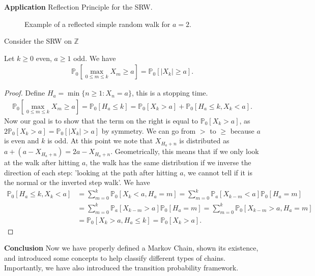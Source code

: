 \noindent
\textbf{Application} Reflection Principle for the SRW.
\begin{figure}[h!]
\begin{center}
\end{center}
\caption{Example of a reflected simple random walk for $a=2$.}
\end{figure}

Consider the SRW on $\mathbb{Z}$ 

\begin{prop}[]
Let $k\geq 0$ even, $a\geq1$ odd. We have 
\begin{align}
	\mathbb{P}_{0} \left[ \max_{0 \leq m \leq k} X_m \geq a \right] = \mathbb{P}_{0} \left[ |X_k|\geq a \right] . 
\end{align}

\end{prop}
\begin{proof}
	Define $H_a= \min\{n \geq 1: X_n =a\}$, this is a stopping time.
	\begin{align}
		\mathbb{P}_{0} \left[ \max_{0 \leq m \leq k}X_m \geq a \right] = \mathbb{P}_{0} \left[ H_a \leq k \right] = \mathbb{P}_{0} \left[ X_k > a \right]  + \mathbb{P}_{0} \left[ H_a \leq k, X_k < a \right] 
		.\end{align}		
	{\color{blue}
	Now our goal is to show that the term on the right is equal to $\mathbb{P}_{0} \left[ X_k > a \right] $, as $2\mathbb{P}_{0} \left[ X_k > a \right] = \mathbb{P}_{0} \left[ |X_k| >a \right] $ by symmetry. We can go from $>$ to $\geq$ because $a$ is even and $k$ is odd. At this point we note that $X_{H_a +n}$ is distributed as $a + (a-X_{H_a +n}) = 2a - X_{H_a +n}$. Geometrically, this means that if we only look at the walk after hitting $a$, the walk has the same distribution if we inverse the direction of each step: 'looking at the path after hitting $a$, we cannot tell if it is the normal or the inverted step walk'. We have}
	\begin{align}
		\mathbb{P}_{0} \left[ H_a \leq k, X_k < a \right] &= \sum_{m=0}^{k} \mathbb{P}_{0} \left[ X_k < a, H_a = m \right] = \sum_{m=0}^{k} \mathbb{P}_{a} \left[ X_{k-m} < a \right] \mathbb{P}_{0} \left[ H_a = m \right]  \\
		&= \sum_{m=0}^{k} \mathbb{P}_{a} \left[ X_{k-m}>a \right] \mathbb{P}_{0} \left[ H_a = m \right] = 
			 \sum_{m=0}^{k} \mathbb{P}_{0} \left[ X_{k-m}>a, H_a =m \right] \\
		&= \mathbb{P}_{0} \left[ X_k >a, H_a \leq k \right] = \mathbb{P}_{0} \left[ X_k > a \right]  
	 .\end{align}	
\end{proof}


\noindent
\textbf{Conclusion} Now we have properly defined a Markov Chain, shown its existence, and introduced some concepts to help classify different types of chains. Importantly, we have also introduced the transition probability framework. 


